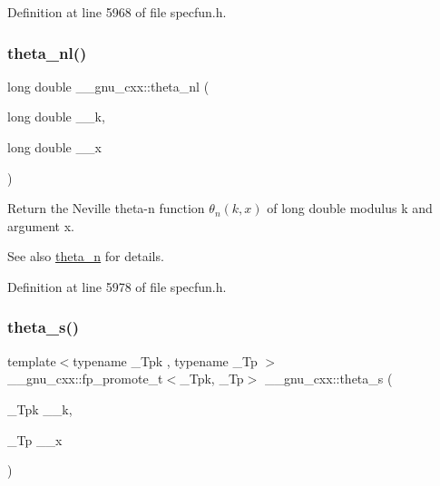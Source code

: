 Definition at line 5968 of file specfun.\+h.

\mbox{\label{group__mathsf__gnu_ga907f6c147387d55d2dfccbc58d1f1bc5}} 
\subsubsection{\texorpdfstring{theta\+\_\+nl()}{theta\_nl()}}
{\footnotesize\ttfamily long double \+\_\+\+\_\+gnu\+\_\+cxx\+::theta\+\_\+nl (\begin{DoxyParamCaption}\item[{long double}]{\+\_\+\+\_\+k,  }\item[{long double}]{\+\_\+\+\_\+x }\end{DoxyParamCaption})\hspace{0.3cm}{\ttfamily [inline]}}

Return the Neville theta-\/n function $ \theta_n(k,x) $ of {\ttfamily long double} modulus {\ttfamily k} and argument {\ttfamily x}.

\begin{DoxySeeAlso}{See also}
\hyperlink{group__mathsf__gnu_ga202778bd650e04e9f3729bfca35c32e2}{theta\+\_\+n} for details. 
\end{DoxySeeAlso}


Definition at line 5978 of file specfun.\+h.

\mbox{\label{group__mathsf__gnu_gaf28f2dca107531890b49cccf2bdd67be}} 
\subsubsection{\texorpdfstring{theta\+\_\+s()}{theta\_s()}}
{\footnotesize\ttfamily template$<$typename \+\_\+\+Tpk , typename \+\_\+\+Tp $>$ \\
\+\_\+\+\_\+gnu\+\_\+cxx\+::fp\+\_\+promote\+\_\+t$<$\+\_\+\+Tpk, \+\_\+\+Tp$>$ \+\_\+\+\_\+gnu\+\_\+cxx\+::theta\+\_\+s (\begin{DoxyParamCaption}\item[{\+\_\+\+Tpk}]{\+\_\+\+\_\+k,  }\item[{\+\_\+\+Tp}]{\+\_\+\+\_\+x }\end{DoxyParamCaption})\hspace{0.3cm}{\ttfamily [inline]}}

